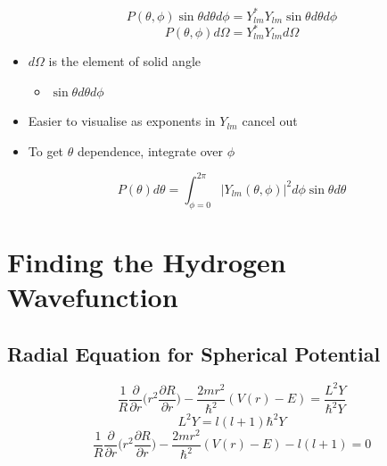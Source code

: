 \documentclass[a4paper,11pt,normalem]{article}
\begin{document}
\[
    P(\theta, \phi) \sin\theta d\theta d\phi = Y_{lm}^* Y_{lm} \sin\theta d\theta d\phi
\] \[
    P(\theta, \phi) d\Omega = Y_{lm}^* Y_{lm} d\Omega
\]
\begin{itemize}
\item
  \(d\Omega\) is the element of solid angle
  \begin{itemize}
  \item
    \(\sin\theta d\theta d\phi\)
  \end{itemize}
\item
  Easier to visualise as exponents in \(Y_{lm}\) cancel out
\item
  To get \(\theta\) dependence, integrate over \(\phi\)
\end{itemize}
\[
    P(\theta) d\theta = \int_{\phi = 0}^{2\pi} |Y_{lm}(\theta, \phi)|^2 d\phi \sin\theta d\theta
\]
\section{Finding the Hydrogen Wavefunction}\label{finding-the-hydrogen-wavefunction}

\subsection{Radial Equation for Spherical Potential}\label{radial-equation-for-spherical-potential}

\[
    \frac{1}{R}\frac{\partial}{\partial r} \Big(r^2 \frac{\partial R}{\partial r} \Big) - \frac{2mr^2}{\hbar^2}(V(r) - E) = \frac{L^2 Y}{\hbar^2 Y} \]
\[
    L^2 Y = l(l + 1)\hbar^2 Y \] \[
    \frac{1}{R}\frac{\partial}{\partial r} \Big(r^2 \frac{\partial R}{\partial r} \Big) - \frac{2mr^2}{\hbar^2}(V(r) - E) - l(l + 1) = 0
\]
\end{document}
